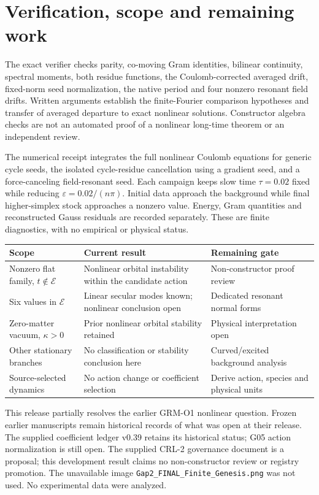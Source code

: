 \documentclass[11pt,a4paper]{article}
\begin{document}
\newpage
\section{Verification, scope and remaining work}
The exact verifier checks parity, co-moving Gram identities, bilinear continuity, spectral moments, both residue functions, the Coulomb-corrected averaged drift, fixed-norm seed normalization, the native period and four nonzero resonant field drifts. Written arguments establish the finite-Fourier comparison hypotheses and transfer of averaged departure to exact nonlinear solutions. Constructor algebra checks are not an automated proof of a nonlinear long-time theorem or an independent review.

The numerical receipt integrates the full nonlinear Coulomb equations for generic cycle seeds, the isolated cycle-residue cancellation using a gradient seed, and a force-canceling field-resonant seed. Each campaign keeps slow time $\tau=0.02$ fixed while reducing $\varepsilon=0.02/(n\pi)$. Initial data approach the background while final higher-simplex stock approaches a nonzero value. Energy, Gram quantities and reconstructed Gauss residuals are recorded separately. These are finite diagnostics, with no empirical or physical status.

\begin{center}\small
\begin{tabular}{p{42mm}p{43mm}p{49mm}}
\toprule
Scope & Current result & Remaining gate\\\midrule
Nonzero flat family, $t\notin\mathcal E$ & Nonlinear orbital instability within the candidate action & Non-constructor proof review\\
Six values in $\mathcal E$ & Linear secular modes known; nonlinear conclusion open & Dedicated resonant normal forms\\
Zero-matter vacuum, $\kappa>0$ & Prior nonlinear orbital stability retained & Physical interpretation open\\
Other stationary branches & No classification or stability conclusion here & Curved/excited background analysis\\
Source-selected dynamics & No action change or coefficient selection & Derive action, species and physical units\\\bottomrule
\end{tabular}
\end{center}

This release partially resolves the earlier GRM-O1 nonlinear question. Frozen earlier manuscripts remain historical records of what was open at their release. The supplied coefficient ledger v0.39 retains its historical status; G05 action normalization is still open. The supplied CRL-2 governance document is a proposal; this development result claims no non-constructor review or registry promotion. The unavailable image \texttt{Gap2\_FINAL\_Finite\_Genesis.png} was not used. No experimental data were analyzed.
\end{document}

